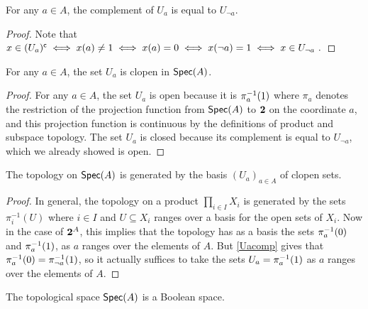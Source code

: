 \documentclass[a4paper]{article}
\begin{document}
\begin{lemma}\label{Uacomp}
    For any $a \in A$, the complement of $U_a$ is equal to $U_{\neg a}$.
\end{lemma}
\begin{proof}
Note that 
$x \in (U_a)^{\mathsf{c}} \iff x(a) \neq 1 \iff x(a) = 0 \iff x(\neg a) =
1 \iff x \in U_{\neg a} \ .$ 
\end{proof}
\begin{lemma}\label{Uaclp}
    For any $a \in A$, the set $U_a$ is clopen in $\operatorname*{\mathsf{Spec}}(A)$.
\end{lemma}
\begin{proof}
    For any $a \in A$, the set $U_a$ is open because it is $\pi_a^{-1}(1)$ where $\pi_a$
    denotes the restriction of the projection function from $\operatorname*{\mathsf{Spec}}(A)$ to
    $\mathbf{2}$ on the coordinate $a$, and this projection function is continuous
    by the definitions of product and subspace topology. The set $U_a$ is
    closed because its complement is equal to $U_{\neg a}$, which we already
    showed is open.
\end{proof}
\begin{proposition}\label{Specbasis}
The topology on $\operatorname*{\mathsf{Spec}}(A)$ is generated by the basis
$(U_a)_{a \in A}$ of clopen sets. 
\end{proposition}
\begin{proof}
    In general, the topology on a product $\prod_{i\in I} X_i$ is generated by
    the sets $\pi_i^{-1}(U)$ where $i \in I$ and $U \subseteq X_i$ ranges over
    a basis for the open sets of $X_i$. Now in the case of $\mathbf{2}^A$, this
    implies that the topology has as a basis the sets $\pi_a^{-1}(0)$ and
    $\pi_a^{-1}(1)$, as $a$ ranges over the elements of $A$. But
    \cref{Uacomp} gives that $\pi_a^{-1}(0) = \pi_{\neg a}^{-1}(1)$, so
    it actually suffices to take the sets $U_a = \pi_a^{-1}(1)$ as $a$
    ranges over the elements of $A$.
\end{proof}
\begin{theorem}
    The topological space $\operatorname*{\mathsf{Spec}}(A)$ is a Boolean space.
\end{theorem}
\end{document}
